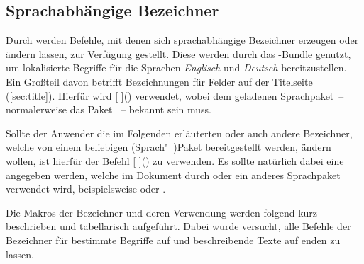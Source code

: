 \begin{Declaration*}{}
\begin{Declaration*}{}
\begin{Declaration*}{}
\section{Sprachabhängige Bezeichner}
%
%
%
%
Durch \KOMAScript{} werden Befehle, mit denen sich sprachabhängige Bezeichner 
erzeugen oder ändern lassen, zur Verfügung gestellt. Diese werden durch das
\TUDScript-Bundle genutzt, um lokalisierte Begriffe für die Sprachen 
\emph{Englisch} und \emph{Deutsch} bereitzustellen. Ein Großteil davon betrifft 
Bezeichnungen für Felder auf der Titelseite (\autoref{sec:title}). Hierfür wird
[%
]()
verwendet, wobei  dem geladenen Sprachpaket~-- normalerweise das 
Paket ~-- bekannt sein muss.

Sollte der Anwender die im Folgenden erläuterten oder auch andere Bezeichner, 
welche von einem beliebigen (Sprach"~)Paket bereitgestellt werden, ändern 
wollen, ist hierfür der Befehl
[%
]()
zu verwenden. Es sollte natürlich dabei eine  angegeben werden, 
welche im Dokument durch  oder ein anderes Sprachpaket verwendet 
wird, beispielsweise  oder . 

Die Makros der Bezeichner und deren Verwendung werden folgend kurz beschrieben 
und tabellarisch aufgeführt. Dabei wurde versucht, alle Befehle der Bezeichner 
für bestimmte Begriffe auf  und beschreibende Texte auf 
 enden zu lassen.


\end{Declaration*}
\end{Declaration*}
\end{Declaration*}
